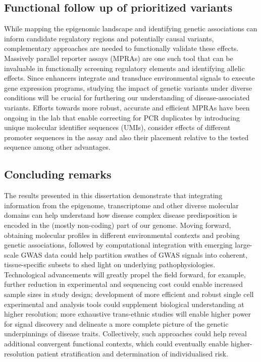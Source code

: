 \subsection{Functional follow up of prioritized variants}
While mapping the epigenomic landscape and identifying genetic associations can inform candidate regulatory regions and potentially causal variants, complementary approaches are needed to functionally validate these effects. Massively parallel reporter assays (MPRAs) are one such tool that can be invaluable in functionally screening regulatory elements and identifying allelic effects. Since enhancers integrate and transduce environmental signals to execute gene expression programs, studying the impact of genetic variants under diverse conditions will be crucial for furthering our understanding of disease-associated variants. Efforts towards more robust, accurate and efficient MPRAs have been ongoing in the lab that enable correcting for PCR duplicates by introducing unique molecular identifier sequences (UMIs), consider effects of different promoter sequences in the assay and also their placement relative to the tested sequence among other advantages.


\subsection{Concluding remarks}
The results presented in this dissertation demonstrate that integrating information from the epigenome, transcriptome and other diverse molecular domains can help understand how disease complex disease predisposition is encoded in the (mostly non-coding) part of our genome. Moving forward, obtaining molecular profiles in different environmental contexts and probing genetic associations, followed by computational integration with emerging large-scale GWAS data could help partition swathes of GWAS signals into coherent, tissue-specific subsets to shed light on underlying pathophysiologies. Technological advancements will greatly propel the field forward, for example, further reduction in experimental and sequencing cost could enable increased sample sizes in study design; development of more efficient and robust single cell experimental and analysis tools could supplement biological understanding at higher resolution; more exhaustive trans-ethnic studies will enable higher power for signal discovery and delineate a more complete picture of the genetic underpinnings of disease traits. Collectively, such approaches could help reveal additional convergent functional contexts, which could eventually enable higher-resolution patient stratification and determination of individualised risk.